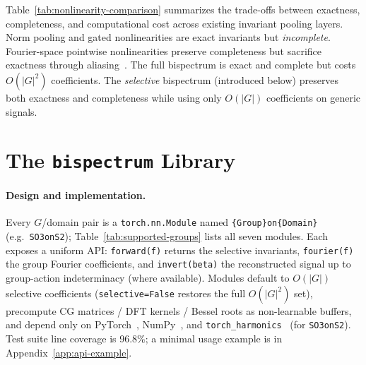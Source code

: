 \documentclass{article}
\theoremstyle{definition}
\theoremstyle{remark}
\theoremstyle{definition}
\begin{document}
Table~\ref{tab:nonlinearity-comparison} summarizes the trade-offs between
exactness, completeness, and computational cost across existing invariant
pooling layers. Norm pooling and gated nonlinearities are exact
invariants but \emph{incomplete}. Fourier-space pointwise
nonlinearities preserve completeness but sacrifice exactness through
\mbox{aliasing~\citep{weiler2019general}}. The full bispectrum is exact and
complete but costs $O(|G|^2)$ coefficients. The \emph{selective}
bispectrum (introduced below) preserves both exactness and completeness
while using only $O(|G|)$ coefficients on generic signals.


\section{The \texttt{bispectrum} Library}
\label{sec:library}

\paragraph{Design and implementation.} \label{sec:design} Every $G$/domain pair is a \texttt{torch.nn.Module} named
\texttt{\{Group\}on\{Domain\}} (e.g.\ \texttt{SO3onS2});
Table~\ref{tab:supported-groups} lists all seven modules. Each exposes a
uniform API: \texttt{forward(f)} returns the selective invariants,
\texttt{fourier(f)} the group Fourier coefficients, and
\texttt{invert(beta)} the reconstructed signal up to group-action
indeterminacy (where available). Modules default to $O(|G|)$
selective coefficients (\texttt{selective=False} restores the full
$O(|G|^2)$ set), precompute CG matrices / DFT kernels / Bessel
roots as non-learnable buffers, and depend only on
PyTorch~\citep{paszke2019pytorch}, NumPy~\citep{harris2020numpy},
and \texttt{torch\_harmonics}~\citep{bonev2023spherical} (for
\texttt{SO3onS2}). Test suite line coverage is 96.8\%; a minimal
usage example is in Appendix~\ref{app:api-example}.
\end{document}
